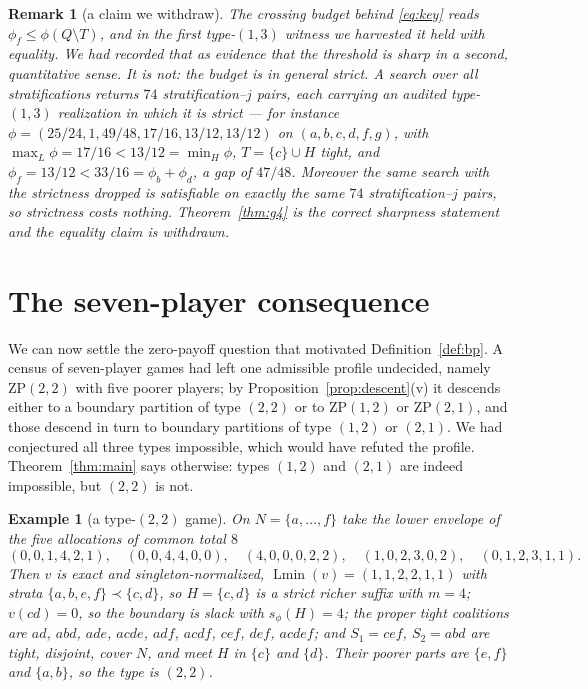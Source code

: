 \documentclass[11pt]{article}
\newtheorem{remark}[theorem]{Remark}
\newtheorem{example}[theorem]{Example}
\newcommand{\Lmin}{\operatorname{Lmin}}
\begin{document}
\begin{remark}[a claim we withdraw]\label{rem:withdraw}
The crossing budget behind \eqref{eq:key} reads
$\phi_f\le\phi(Q\setminus T)$, and in the first type-$(1,3)$ witness we
harvested it held with equality.  We had recorded that as evidence that the
threshold is sharp in a second, quantitative sense.  It is not: the budget is
in general strict.  A search over all stratifications returns $74$
stratification--$j$ pairs, each carrying an audited type-$(1,3)$ realization
in which it is strict ---
for instance
$\phi=(25/24,1,49/48,17/16,13/12,13/12)$ on $(a,b,c,d,f,g)$, with
$\max_L\phi=17/16<13/12=\min_H\phi$, $T=\{c\}\cup H$ tight, and
$\phi_f=13/12<33/16=\phi_b+\phi_d$, a gap of $47/48$.  Moreover the same search
with the strictness dropped is satisfiable on exactly the same $74$
stratification--$j$ pairs, so strictness costs nothing.  Theorem~\ref{thm:g4}
is the correct sharpness statement and the equality claim is withdrawn.
\end{remark}

\section{The seven-player consequence}\label{sec:zp}

We can now settle the zero-payoff question that motivated
Definition~\ref{def:bp}.  A census of seven-player games had left one
admissible profile undecided, namely $\mathrm{ZP}(2,2)$ with five poorer
players; by Proposition~\ref{prop:descent}(v) it descends either to a boundary
partition of type $(2,2)$ or to $\mathrm{ZP}(1,2)$ or $\mathrm{ZP}(2,1)$, and
those descend in turn to boundary partitions of type $(1,2)$ or $(2,1)$.  We
had conjectured all three types impossible, which would have refuted the
profile.  Theorem~\ref{thm:main} says otherwise: types $(1,2)$ and $(2,1)$ are
indeed impossible, but $(2,2)$ is not.

\begin{example}[a type-$(2,2)$ game]\label{ex:22}
On $N=\{a,\dots,f\}$ take the lower envelope of the five allocations of common
total $8$
\[
 (0,0,1,4,2,1),\quad(0,0,4,4,0,0),\quad(4,0,0,0,2,2),\quad
 (1,0,2,3,0,2),\quad(0,1,2,3,1,1).
\]
Then $v$ is exact and singleton-normalized, $\Lmin(v)=(1,1,2,2,1,1)$ with
strata $\{a,b,e,f\}\prec\{c,d\}$, so $H=\{c,d\}$ is a strict richer suffix with
$m=4$; $v(cd)=0$, so the boundary is slack with $s_\phi(H)=4$; the proper
tight coalitions are $ad$, $abd$, $ade$, $acde$, $adf$, $acdf$, $cef$, $def$,
$acdef$; and $S_1=cef$, $S_2=abd$ are tight, disjoint, cover $N$, and meet $H$
in $\{c\}$ and $\{d\}$.  Their poorer parts are $\{e,f\}$ and $\{a,b\}$, so the
type is $(2,2)$.
\end{example}
\end{document}
